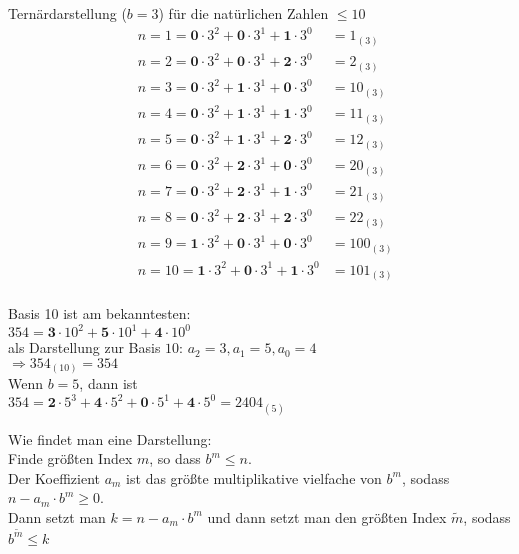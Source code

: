 \documentclass[../ana1u.tex]{subfiles}
\begin{document}
\begin{bsp}
    Ternärdarstellung (\(b = 3\)) für die natürlichen Zahlen \(\leq 10\)
    \begin{align*}
        &n = 1 = \textbf{0} \cdot 3^2 + \textbf{0} \cdot 3^1 + \textbf{1} \cdot 3^0 
        &= 1_{(3)} \\
        &n = 2 = \textbf{0} \cdot 3^2 + \textbf{0} \cdot 3^1 + \textbf{2} \cdot 3^0 
        &= 2_{(3)} \\
        &n = 3 = \textbf{0} \cdot 3^2 + \textbf{1} \cdot 3^1 + \textbf{0} \cdot 3^0 
        &= 10_{(3)} \\
        &n = 4 = \textbf{0} \cdot 3^2 + \textbf{1} \cdot 3^1 + \textbf{1} \cdot 3^0 
        &= 11_{(3)} \\
        &n = 5 = \textbf{0} \cdot 3^2 + \textbf{1} \cdot 3^1 + \textbf{2} \cdot 3^0 
        &= 12_{(3)} \\
        &n = 6 = \textbf{0} \cdot 3^2 + \textbf{2} \cdot 3^1 + \textbf{0} \cdot 3^0 
        &= 20_{(3)} \\
        &n = 7 = \textbf{0} \cdot 3^2 + \textbf{2} \cdot 3^1 + \textbf{1} \cdot 3^0 
        &= 21_{(3)} \\
        &n = 8 = \textbf{0} \cdot 3^2 + \textbf{2} \cdot 3^1 + \textbf{2} \cdot 3^0 
        &= 22_{(3)} \\
        &n = 9 = \textbf{1} \cdot 3^2 + \textbf{0} \cdot 3^1 + \textbf{0} \cdot 3^0 
        &= 100_{(3)} \\
        &n = 10 = \textbf{1} \cdot 3^2 + \textbf{0} \cdot 3^1 + \textbf{1} \cdot 3^0 
        &= 101_{(3)} \\
    \end{align*}
\end{bsp}
\begin{bsp}
    Basis 10 ist am bekanntesten:\\
    \(354 = \textbf{3} \cdot 10^2 + \textbf{5} \cdot 10^1 + \textbf{4} \cdot 10^0 \) \\
    als Darstellung zur Basis \(10\): \(a_2 = 3, a_1 = 5, a_0 = 4 \) \\
    \(\Rightarrow 354_{(10)} = 354 \) \\
    Wenn \(b = 5 \), dann ist \\
    \(354 = \textbf{2} \cdot 5^3 + \textbf{4} \cdot 5^2 + \textbf{0} \cdot 5^1 + \textbf{4} 
    \cdot 5^0 = 2404_{(5)}\)
\end{bsp}
\begin{bem} %
    Wie findet man eine Darstellung:\\
    Finde größten Index \(m\), so dass \(b^m \leq n\).\\
    Der Koeffizient \(a_m\) ist das größte multiplikative vielfache von \(b^m\), 
    sodass \(n - a_m \cdot b^m \geq 0\).\\
    Dann setzt man \(k=n-a_m \cdot b^m\) und dann setzt man den größten Index \(\tilde{m}\), 
    sodass \(b^{\tilde{m}} \leq k\)
\end{bem}
\end{document}
